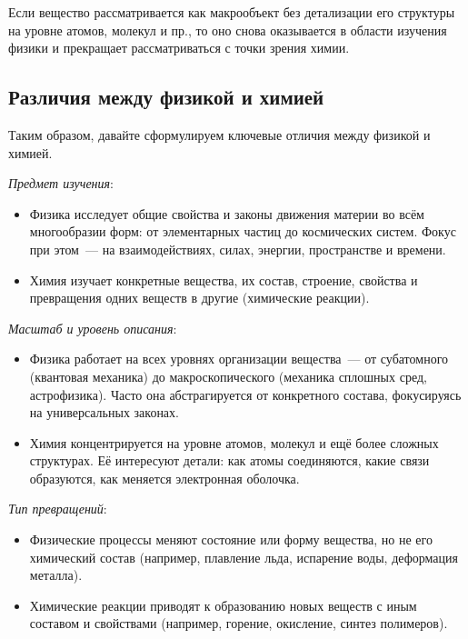 Если вещество рассматривается как макрообъект без детализации его структуры на уровне атомов, молекул и пр., то оно снова оказывается в области изучения физики и прекращает рассматриваться с точки зрения химии.

\subsection*{Различия между физикой и химией}

Таким образом, давайте сформулируем ключевые отличия между физикой и химией.

\textit{Предмет изучения}:

\begin{itemize}
    \item Физика исследует общие свойства и законы движения материи во всём многообразии форм: от элементарных частиц до космических систем. Фокус при этом~--- на взаимодействиях, силах, энергии, пространстве и времени.
    \item Химия изучает конкретные вещества, их состав, строение, свойства и превращения одних веществ в другие (химические реакции).
\end{itemize}

\textit{Масштаб и уровень описания}:

\begin{itemize}
    \item Физика работает на всех уровнях организации вещества~--- от субатомного (квантовая механика) до макроскопического (механика сплошных сред, астрофизика). Часто она абстрагируется от конкретного состава, фокусируясь на универсальных законах.
    \item Химия концентрируется на уровне атомов, молекул и ещё более сложных структурах. Её интересуют детали: как атомы соединяются, какие связи образуются, как меняется электронная оболочка.
\end{itemize}

\textit{Тип превращений}:

\begin{itemize}
    \item Физические процессы меняют состояние или форму вещества, но не его химический состав (например, плавление льда, испарение воды, деформация металла).
    \item Химические реакции приводят к образованию новых веществ с иным составом и свойствами (например, горение, окисление, синтез полимеров).
\end{itemize}

